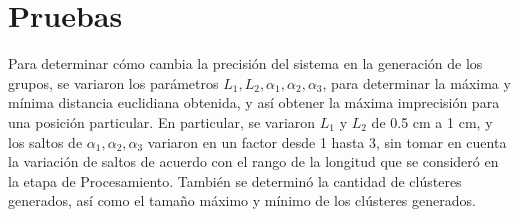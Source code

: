 \section{Pruebas}

Para determinar cómo cambia la precisión del sistema en la generación de los grupos, se variaron los parámetros $L_1, L_2, \alpha_1, \alpha_2, \alpha_3$, para determinar la máxima y mínima distancia euclidiana obtenida, y así obtener la máxima imprecisión para una posición particular. En particular, se variaron $L_1$ y $L_2$ de 0.5 cm a 1 cm, y los saltos de $\alpha_1, \alpha_2, \alpha_3$ variaron en un factor desde 1 hasta 3, sin tomar en cuenta la variación de saltos de acuerdo con el rango de la longitud que se consideró en la etapa de Procesamiento. También se determinó la cantidad de clústeres generados, así como el tamaño máximo y mínimo de los clústeres generados.